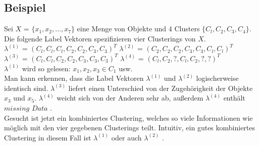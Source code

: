 \documentclass[runningheads]{llncs}
\begin{document}
\subsection{Beispiel}
Sei $X$ = $\{x_1, x_2, \ldots, x_7\}$ eine Menge von Objekte und 4 Clusters $\{C_{l}, C_{2}, C_{3}, C_{4}\}$. Die folgende Label Vektoren spezifizieren  vier Clusterings von $X$.\\[4pt]
$\lambda^{(1)}$ = $(C_{l}, C_{l}, C_{l}, C_{2}, C_{2}, C_{3}, C_{3})^{T}$ \qquad		
$\lambda^{(2)}$ = $(C_{2}, C_{2}, C_{2}, C_{3}, C_{3}, C_{l}, C_{l})^{T}$ \\
$\lambda^{(3)}$ = $(C_{l}, C_{l}, C_{2}, C_{2}, C_{3}, C_{3}, C_{3})^{T}$	\qquad
$\lambda^{(4)}$ = $(C_{l}, C_{2}, ?, C_{l}, C_{2}, ?, ?)^{T}$ \\[4pt]
$\lambda^{(1)}$ wird so gelesen: $x_1, x_2, x_3 \in C_{1}$ usw.\\
Man kann erkennen, dass die Label Vektoren $\lambda^{(1)}$ und $\lambda^{(2)}$ logischerweise identisch sind. $\lambda^{(3)}$ liefert einen Unterschied von der Zugehörigkeit der Objekte $x_3$ und $x_5$. $\lambda^{(4)}$ weicht sich von der Anderen sehr ab, außerdem $\lambda^{(4)}$ enthält $missing$ $Data$ \cite{strehl2002cluster}.\\
Gesucht ist jetzt ein kombiniertes Clustering, welches so viele Informationen wie möglich mit den vier gegebenen Clusterings teilt. Intuitiv, ein gutes kombiniertes Clustering in diesem Fall ist  $\lambda^{(1)}$ oder auch $\lambda^{(2)}$ .
\end{document}
